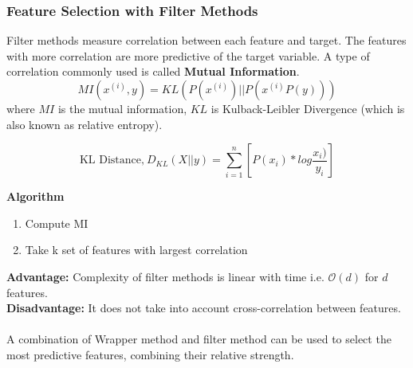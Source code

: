 \documentclass[12pt,a4paper,titlepage,landscape]{book}
\begin{document}
	\subsubsection{Feature Selection with Filter Methods}
	Filter methods measure correlation between each feature and target. The features with more correlation are more predictive of the target variable. A type of correlation commonly used is called \textbf{Mutual Information}.
	$$MI(x^{(i)},y) = KL\left(P\left(x^{(i)}\right) || P\left(x^{(i)}P(y)\right)\right)$$
	where $MI$ is the mutual information, $KL$ is Kulback-Leibler Divergence (which is also known as relative entropy).
	
	$$\text{KL Distance,}~D_{KL}(X||y) = \sum_{i=1}^{n}[P(x_i)*log\dfrac{x_i)}{y_i}]$$
	
	\textbf{Algorithm}
	\begin{enumerate}
		\item Compute MI
		\item Take k set of features with largest correlation
	\end{enumerate} 
	\textbf{Advantage: }Complexity of filter methods is linear with time i.e. $\mathcal{O}(d)$ for $d$ features. \\
	\textbf{Disadvantage: }It does not take into account cross-correlation between features. \\\\
	A combination of Wrapper method and filter method can be used to select the most predictive features, combining their relative strength.
	
	
	
	
	
	
	
	
	
\end{document}

